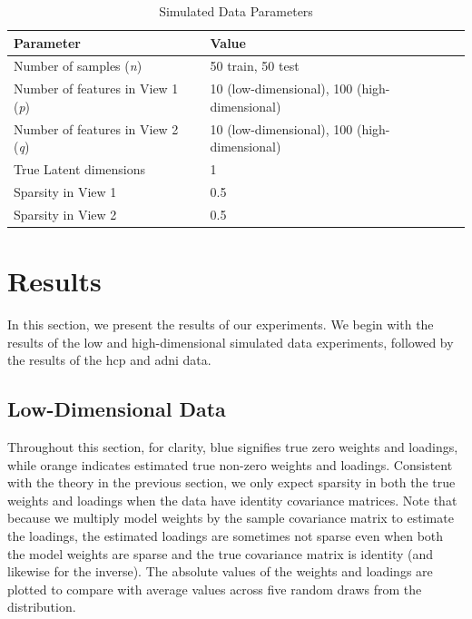 \begin{table}
\centering
\caption{Simulated Data Parameters}
\begin{tabular}{| l | l |}
\hline
\textbf{Parameter} & \textbf{Value} \\
\hline
Number of samples (\textit{n}) & 50 train, 50 test \\
Number of features in View 1 (\textit{p}) & 10 (low-dimensional), 100 (high-dimensional) \\
Number of features in View 2 (\textit{q}) & 10 (low-dimensional), 100 (high-dimensional) \\
True Latent dimensions & 1 \\
Sparsity in View 1 & 0.5 \\
Sparsity in View 2 & 0.5 \\
\hline
\end{tabular}\label{tab:simulated-data-parameters}
\end{table}
\newpage
\section{Results}

In this section, we present the results of our experiments.
We begin with the results of the low and high-dimensional simulated data experiments, followed by the results of the \acrshort{hcp} and \acrshort{adni} data.

\subsection{Low-Dimensional Data}

Throughout this section, for clarity, blue signifies true zero weights and loadings, while orange indicates estimated true non-zero weights and loadings.
Consistent with the theory in the previous section, we only expect sparsity in both the true weights and \gls{loadings} when the data have identity covariance matrices.
Note that because we multiply model weights by the sample covariance matrix to estimate the loadings, the estimated \gls{loadings} are sometimes not sparse even when both the model weights are sparse and the true covariance matrix is identity (and likewise for the inverse).
The absolute values of the weights and \gls{loadings} are plotted to compare with average values across five random draws from the distribution.

